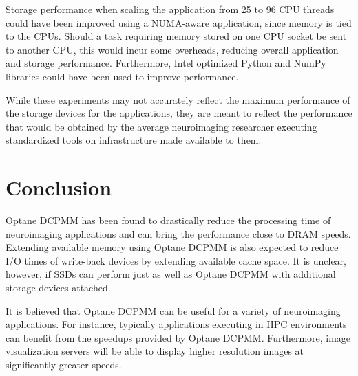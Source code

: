 Storage performance when scaling the application from 25 to 96 CPU threads could
have been improved using a NUMA-aware application, since memory is tied to the
CPUs. Should a task requiring memory stored on one CPU socket be sent to another
CPU, this would incur some overheads, reducing overall application and storage
performance. Furthermore, Intel optimized Python and NumPy libraries could have
been used to improve performance.

While these experiments may not accurately reflect the maximum performance of
the storage devices for the applications, they are meant to reflect the
performance that would be obtained by the average neuroimaging researcher
executing standardized tools on infrastructure made available to them.

\section{Conclusion}

Optane DCPMM has been found to drastically reduce the processing time of
neuroimaging applications and can bring the performance close to DRAM speeds.
Extending available memory using Optane DCPMM is also expected to reduce I/O
times of write-back devices by extending available cache space. It is unclear,
however, if SSDs can perform just as well as Optane DCPMM with additional
storage devices attached.

It is believed that Optane DCPMM can be useful for a variety of neuroimaging
applications. For instance, typically applications executing in HPC environments
can benefit from the speedups provided by Optane DCPMM. Furthermore, image
visualization servers will be able to display higher resolution images at
significantly greater speeds.
